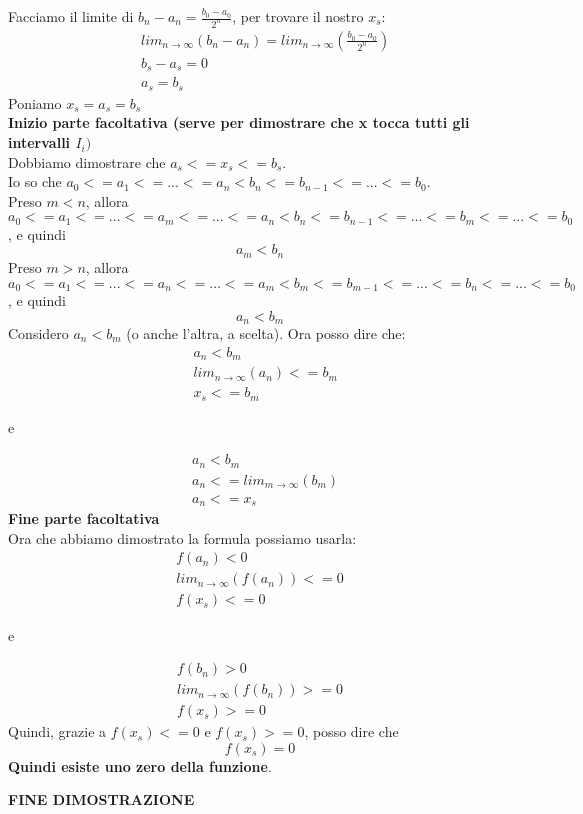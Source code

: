 \documentclass[11pt]{article}
\begin{document}
Facciamo il limite di $b_{n} - a_{n} = \frac{b_{0} - a_{0}}{2^{n}}$, per trovare il nostro $x_{s}$:
\begin{align}
    &lim_{n \rightarrow \infty}(b_{n} - a_{n}) = lim_{n \rightarrow \infty}(\frac{b_{0} - a_{0}}{2^{n}})\\
    &b_{s} - a_{s} = 0\\
    &a_{s} = b_{s}
\end{align}
Poniamo $x_{s} = a_{s} = b_{s}$\\
\textbf{Inizio parte facoltativa (serve per dimostrare che x tocca tutti gli intervalli $I_{i})$}\\
Dobbiamo dimostrare che $a_{s} <= x_{s} <= b_{s}$.\\
Io so che $a_{0} <= a_{1} <= ... <= a_{n} < b_{n} <= b_{n-1} <= ... <= b_{0}$.\\

Preso $m < n$, allora $a_{0} <= a_{1} <= ... <= a_{m} <= ... <= a_{n} < b_{n} <= b_{n-1} <= ... <= b_{m} <= ... <= b_{0}$, 
e quindi $$a_{m} < b_{n}$$
Preso $m > n$, allora $a_{0} <= a_{1} <= ... <= a_{n} <= ... <= a_{m} < b_{m} <= b_{m-1} <= ... <= b_{n} <= ... <= b_{0}$, 
e quindi $$a_{n} < b_{m}$$
Considero $a_{n} < b_{m}$ (o anche l'altra, a scelta). Ora posso dire che:
\begin{align}
    &a_{n} < b_{m}\\
    &lim_{n \rightarrow \infty}(a_{n}) <= b_{m}\\
    &x_{s} <= b_{m}
\end{align}
\begin{center}
    e
\end{center}
\begin{align}
    &a_{n} < b_{m}\\
    &a_{n} <= lim_{m \rightarrow \infty}(b_{m})\\
    &a_{n} <= x_{s}
\end{align}
\textbf{Fine parte facoltativa}\\
Ora che abbiamo dimostrato la formula possiamo usarla:
\begin{align}
    f(a_{n}) < 0\\
    lim_{n \rightarrow \infty}(f(a_{n})) <= 0\\
    f(x_{s}) <= 0
\end{align}
\begin{center}
    e
\end{center}
\begin{align}
    f(b_{n}) > 0\\
    lim_{n \rightarrow \infty}(f(b_{n})) >= 0\\
    f(x_{s}) >= 0
\end{align}
Quindi, grazie a $f(x_{s}) <= 0$ e $f(x_{s}) >= 0$, posso dire che 
$$f(x_{s}) = 0$$
\textbf{Quindi esiste uno zero della funzione}.
\begin{center}
   \textbf{FINE DIMOSTRAZIONE}
\end{center}
\end{document}
